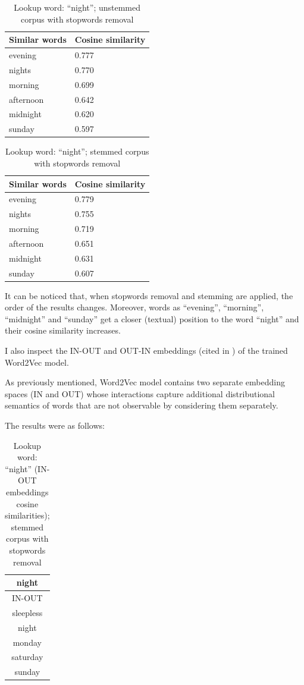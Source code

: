 \begin{table}[H]
\centering
\begin{tabular}{ll}
\textbf{Similar words} & \textbf{Cosine similarity} \\ \hline  
evening & 0.777 \\
nights & 0.770 \\
morning & 0.699 \\
afternoon & 0.642 \\
midnight & 0.620 \\
sunday & 0.597 \\
\end{tabular}
\caption{Lookup word: ``night''; unstemmed corpus with stopwords removal}
\end{table}

\begin{table}[H]
\centering
\begin{tabular}{ll}
\textbf{Similar words} & \textbf{Cosine similarity} \\ \hline  
evening & 0.779 \\
nights & 0.755 \\
morning & 0.719 \\
afternoon & 0.651 \\
midnight & 0.631 \\
sunday & 0.607 \\
\end{tabular}
\caption{Lookup word: ``night''; stemmed corpus with stopwords removal}
\end{table}

It can be noticed that, when stopwords removal and stemming are applied, the order of the results changes. Moreover, words as ``evening'', ``morning'', ``midnight'' and ``sunday'' get a closer (textual) position to the word ``night'' and their cosine similarity increases.

I also inspect the IN-OUT and OUT-IN embeddings (cited in \cite{Mitra2016ADE}) of the trained Word2Vec model.

As previously mentioned, Word2Vec model contains two separate embedding spaces (IN and OUT)
whose interactions capture additional distributional semantics of words
that are not observable by considering them separately.

The results were as follows:

\begin{table}[H]
\centering
\begin{tabular}{c}
\hline
\textbf{night} \\ \hline
IN-OUT \\ \hline
sleepless \\
night \\
monday \\
saturday \\
sunday \\
\hline
\end{tabular}
\caption{Lookup word: ``night'' (IN-OUT embeddings cosine similarities); stemmed corpus with stopwords removal}
\label{tab:embsim2}
\end{table}

